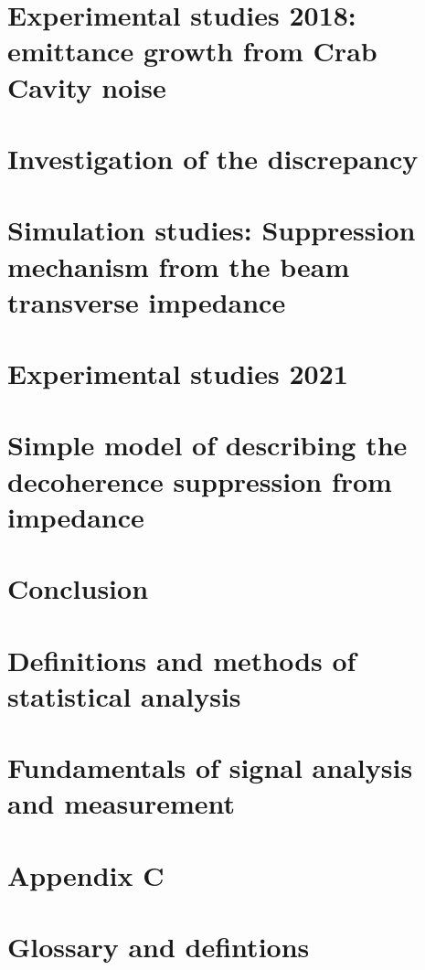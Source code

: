 \documentclass[12pt,twoside]{report} %
\begin{document}
\chapter{Experimental studies 2018: emittance growth from Crab Cavity noise}\label{Ch:2018_analyisis}


%

\chapter{Investigation of the discrepancy}\label{Ch:investigating_discrepancy}


\chapter{Simulation studies: Suppression mechanism from the beam transverse impedance}\label{Ch:suppression_impedances}\label{Ch:suppression_impedance}


\chapter{Experimental studies 2021}


\chapter{Simple model of describing the decoherence suppression from impedance}







\chapter{Conclusion}


\printglossaries
\appendix
\chapter{Definitions and  methods of statistical analysis}\label{ch:app_A}

\chapter{Fundamentals of signal analysis and measurement}\label{ch:app_B}

\chapter{Appendix C}\label{ch:app_B}

\chapter{Glossary and defintions}


\backmatter
\printbibliography
{}
\end{document}
